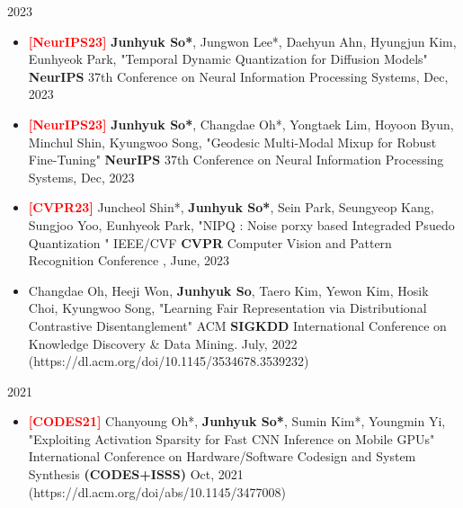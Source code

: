 \documentclass[a4paper,20pt]{article}
\begin{document}
2023
\begin{itemize}
    \item \textcolor{red}{\textbf{[NeurIPS23]}} \textbf{Junhyuk So*}, Jungwon Lee*, Daehyun Ahn, Hyungjun Kim, Eunhyeok Park, "Temporal Dynamic Quantization for Diffusion Models" \textbf{NeurIPS} 37th Conference on Neural Information Processing Systems, Dec, 2023
    \item \textcolor{red}{\textbf{[NeurIPS23]}} \textbf{Junhyuk So*}, Changdae Oh*,  Yongtaek Lim, Hoyoon Byun, Minchul Shin, Kyungwoo Song, "Geodesic Multi-Modal Mixup for Robust Fine-Tuning" \textbf{NeurIPS} 37th Conference on Neural Information Processing Systems, Dec, 2023

    \item  \textcolor{red}{\textbf{[CVPR23]}} Juncheol Shin*, \textbf{Junhyuk So*},  Sein Park, Seungyeop Kang, Sungjoo Yoo, Eunhyeok Park, "NIPQ : Noise porxy based Integraded Psuedo Quantization " IEEE/CVF \textbf{CVPR} Computer Vision and Pattern Recognition Conference , June, 2023 

\end{itemize}
\begin{itemize}
    \item Changdae Oh, Heeji Won, \textbf{Junhyuk So}, Taero Kim, Yewon Kim, Hosik Choi, Kyungwoo Song, "Learning Fair Representation via Distributional Contrastive Disentanglement" ACM \textbf{SIGKDD} International Conference on Knowledge Discovery \& Data Mining. July, 2022 (https://dl.acm.org/doi/10.1145/3534678.3539232)
\end{itemize}
2021
\begin{itemize}
\item \textcolor{red}{\textbf{[CODES21]}} Chanyoung Oh*, \textbf{Junhyuk So*}, Sumin Kim*, Youngmin Yi, "Exploiting Activation Sparsity for Fast CNN Inference on Mobile GPUs" International Conference on Hardware/Software Codesign and System  Synthesis \textbf{(CODES+ISSS)} Oct, 2021 (https://dl.acm.org/doi/abs/10.1145/3477008)
\end{itemize}
\end{document}
